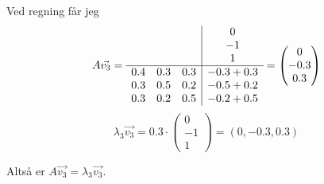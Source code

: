 Ved regning får jeg
$$A\vec{v_3} = \begin{array}{c c c|c}
                   & & & 0 \\
                   & & & -1 \\
                   & & & 1 \\
                  \hline
                  0.4 & 0.3 & 0.3 & -0.3 + 0.3 \\
                  0.3 & 0.5 & 0.2 & -0.5 + 0.2 \\
                  0.3 & 0.2 & 0.5 & -0.2 + 0.5
                  \end{array}
             = \begin{pmatrix} 0 \\ -0.3 \\ 0.3 \end{pmatrix}$$
$$\lambda_3\vec{v_3} = 0.3\cdot \begin{pmatrix} 0 \\ -1 \\ 1 \end{pmatrix}
                     = (0, -0.3, 0.3)$$

Altså er $A\vec{v_3} = \lambda_3\vec{v_3}$.
